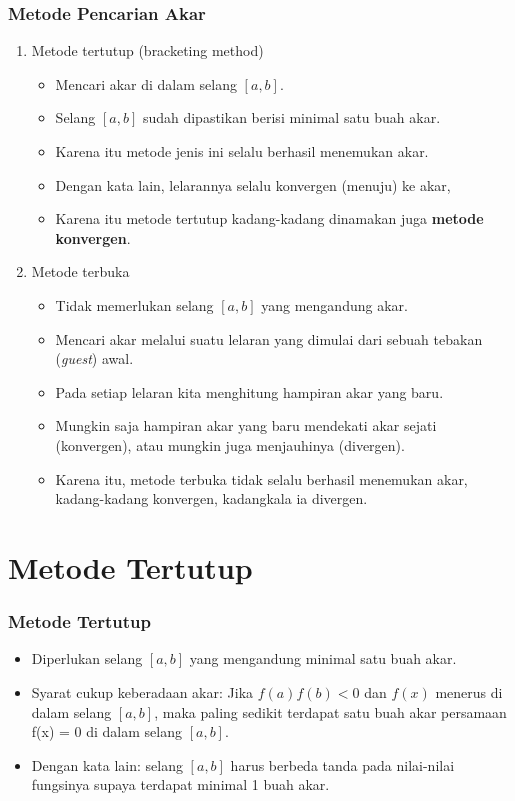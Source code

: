 \documentclass[pdflatex,compress]{beamer}
\begin{document}
\begin{frame}
	\frametitle{Metode Pencarian Akar}
	\begin{enumerate}
		\item Metode tertutup (bracketing method)
		\begin{itemize}
			\item Mencari akar di dalam selang $ [a, b] $.
			\item Selang $ [a, b] $ sudah dipastikan berisi minimal satu buah akar.
			\item Karena itu metode jenis ini selalu berhasil menemukan akar.
			\item Dengan kata lain, lelarannya selalu konvergen (menuju) ke akar,
			\item Karena itu metode tertutup kadang-kadang dinamakan juga \textbf{metode konvergen}.
		\end{itemize}
	\end{enumerate}
\end{frame}

\begin{frame}
	\begin{enumerate}
		\setcounter{enumi}{1}
		\item Metode terbuka
		\begin{itemize}
			\item Tidak memerlukan selang $ [a, b] $ yang mengandung akar.
			\item Mencari akar melalui suatu lelaran yang dimulai
			dari sebuah tebakan (\textit{guest}) awal.
			\item Pada setiap lelaran kita menghitung hampiran akar yang baru.
			\item Mungkin saja hampiran akar yang baru mendekati akar sejati (konvergen), atau mungkin juga menjauhinya (divergen).
			\item Karena itu, metode terbuka tidak selalu berhasil menemukan akar, kadang-kadang konvergen, kadangkala ia divergen.
		\end{itemize}
	\end{enumerate}
\end{frame}

\section{Metode Tertutup}

\begin{frame}
	\frametitle{Metode Tertutup}
	\begin{itemize}
		\item Diperlukan selang $ [a, b] $ yang mengandung minimal satu buah akar.
		\item Syarat cukup keberadaan akar: Jika $ f(a) f(b) < 0 $ dan $ f(x) $ menerus di dalam selang $ [a, b] $, maka paling sedikit terdapat satu buah akar persamaan f(x) = 0 di dalam selang $ [a, b] $.
		\item Dengan kata lain: selang $ [a, b] $ harus berbeda tanda pada nilai-nilai fungsinya supaya terdapat minimal 1 buah akar.
	\end{itemize}
\end{frame}
\end{document}
